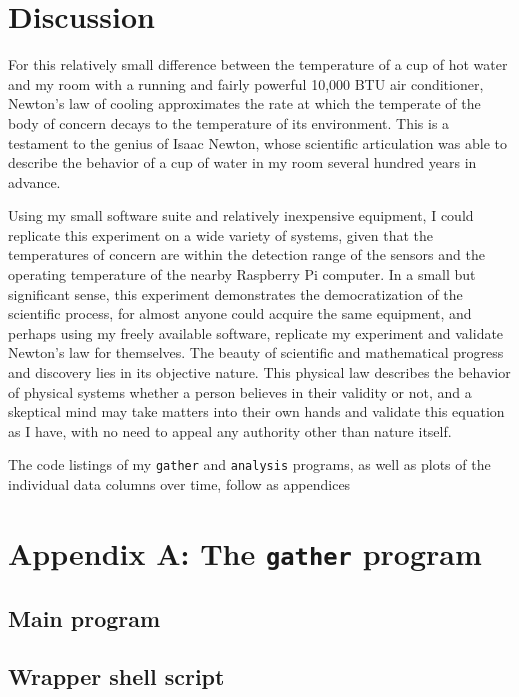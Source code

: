 \documentclass[12pt]{article}
\begin{document}
\section{Discussion}

For this relatively small difference
between the temperature of a cup of hot water
and my room with a running and fairly powerful 10,000 BTU air conditioner,
Newton's law of cooling approximates
the rate at which the temperate of the body of concern
decays to the temperature of its environment.
This is a testament to the genius of Isaac Newton,
whose scientific articulation was able to describe
the behavior of a cup of water in my room
several hundred years in advance.

Using my small software suite
and relatively inexpensive equipment,
I could replicate this experiment
on a wide variety of systems,
given that the temperatures of concern
are within the detection range of the sensors
and the operating temperature of the nearby
Raspberry Pi computer.
In a small but significant sense,
this experiment demonstrates the democratization of the scientific process,
for almost anyone could acquire the same equipment,
and perhaps using my freely available software,
replicate my experiment and validate Newton's law for themselves.
The beauty of scientific and mathematical progress and discovery
lies in its objective nature.
This physical law describes the behavior of physical systems
whether a person believes in their validity or not,
and a skeptical mind may take matters into their own hands
and validate this equation as I have,
with no need to appeal any authority other than nature itself.

\medskip
\noindent
The code listings of my \texttt{gather} and \texttt{analysis} programs,
as well as plots of the individual data columns over time,
follow as appendices

\section{Appendix A: The \texttt{gather} program} \label{apxA}

\subsection{Main program}



\subsection{Wrapper shell script}
\end{document}
